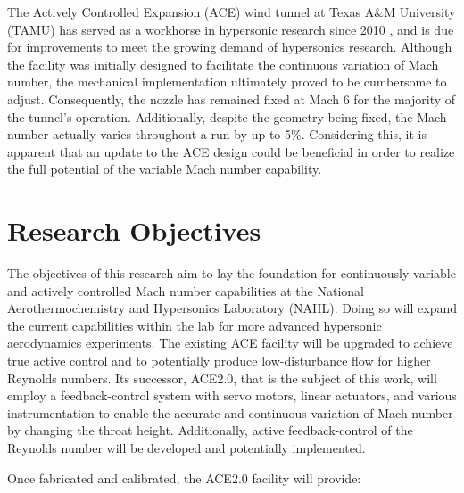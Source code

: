 The Actively Controlled Expansion (ACE) wind tunnel at Texas A\&M University (TAMU) has served as a workhorse in hypersonic research since 2010 \cite{ace09,ace10-calibrate,tichenor-dis,aceturb,mai-dis,neel-dis,leidy-dis}, and is due for improvements to meet the growing demand of hypersonics research. Although the facility was initially designed to facilitate the continuous variation of Mach number, the mechanical implementation ultimately proved to be cumbersome to adjust. Consequently, the nozzle has remained fixed at Mach 6 for the majority of the tunnel's operation. Additionally, despite the geometry being fixed, the Mach number actually varies throughout a run by up to 5\%. Considering this, it is apparent that an update to the ACE design could be beneficial in order to realize the full potential of the variable Mach number capability.

\section{Research Objectives}

The objectives of this research aim to lay the foundation for continuously variable and actively controlled Mach number capabilities at the National Aerothermochemistry and Hypersonics Laboratory (NAHL). Doing so will expand the current capabilities within the lab for more advanced hypersonic aerodynamics experiments. The existing ACE facility will be upgraded to achieve true active control and to potentially produce low-disturbance flow for higher Reynolds numbers. Its successor, ACE2.0, that is the subject of this work, will employ a feedback-control system with servo motors, linear actuators, and various instrumentation to enable the accurate and continuous variation of Mach number by changing the throat height. Additionally, active feedback-control of the Reynolds number will be developed and potentially implemented. 

Once fabricated and calibrated, the ACE2.0 facility will provide:

